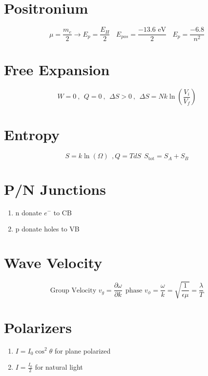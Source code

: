 \documentclass[10pt,letter]{article}
\begin{document}
\section{Positronium} %
\label{sec:positronium_}
\begin{equation}
    \mu = \frac{m_e}{2} \rightarrow E_p = \frac{E_H}{2} ~~~~ E_{pos} = \frac{-13.6 \textrm{ eV}}{2} ~~~~ E_p = \frac{-6.8}{n^2}
\end{equation}

\section{Free Expansion} %
\label{sec:free_expansion}
\begin{equation}
    W = 0~,~~ Q = 0~,~~ \Delta S > 0~,~~ \Delta S = Nk \ln \left( \frac{V_i}{V_f} \right) 
\end{equation}

\section{Entropy} %
\label{sec:entropy}
\begin{equation}
    S = k\ln (\Omega)~~, Q = TdS~~ S_{\textrm{tot}}= S_A + S_B
\end{equation}

\section{P/N Junctions} %
\label{sec:p_n_junctions}
\begin{enumerate}
    \item n donate $e^-$ to CB 
    \item p donate holes to VB
\end{enumerate}

\section{Wave Velocity} %
\label{sec:wave_velocity}
\begin{equation}
    \textrm{Group Velocity } v_g = \frac{\partial \omega }{\partial k}~~ \textrm{phase }v_\phi = \frac{\omega}{k} = \sqrt{\frac{1}{\epsilon \mu}} = \frac{\lambda}{T}
\end{equation}

\section{Polarizers} %
\label{sec:polarizers}
\begin{enumerate}
    \item $I=I_0 \cos^2 \theta$ for plane polarized 
    \item $I = \frac{I_0}{2}$ for natural light
\end{enumerate}
\end{document}
